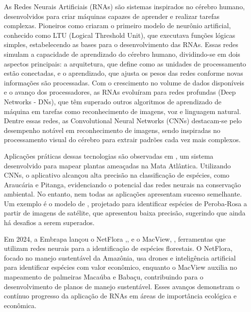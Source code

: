 As Redes Neurais Artificiais (RNAs) são sistemas inspirados no cérebro humano, desenvolvidos para criar máquinas capazes de aprender e realizar tarefas complexas. Pioneiros como \textcite{mcculloch1943logical} criaram o primeiro modelo de neurônio artificial, conhecido como LTU (Logical Threshold Unit), que executava funções lógicas simples, estabelecendo as bases para o desenvolvimento das RNAs. Essas redes simulam a capacidade de aprendizado do cérebro humano, dividindo-se em dois aspectos principais: a arquitetura, que define como as unidades de processamento estão conectadas, e o aprendizado, que ajusta os pesos das redes conforme novas informações são processadas.
Com o crescimento no volume de dados disponíveis e o avanço dos processadores, as RNAs evoluíram para redes profundas (Deep Networks - DNs), que têm superado outros algoritmos de aprendizado de máquina em tarefas como reconhecimento de imagens, voz e linguagem natural. Dentre essas redes, as Convolutional Neural Networks (CNNs) destacam-se pelo desempenho notável em reconhecimento de imagens, sendo inspiradas no processamento visual do cérebro para extrair padrões cada vez mais complexos.

Aplicações práticas dessas tecnologias são observadas em \textcite{de2020plantai}, um sistema desenvolvido para mapear plantas ameaçadas na Mata Atlântica. Utilizando CNNs, o aplicativo alcançou alta precisão na classificação de espécies, como Araucária e Pitanga, evidenciando o potencial das redes neurais na conservação ambiental. No entanto, nem todas as aplicações apresentam sucesso semelhante. Um exemplo é o modelo de \textcite{carneiro2023uso} , projetado para identificar espécies de Peroba-Rosa a partir de imagens de satélite, que apresentou baixa precisão, sugerindo que ainda há desafios a serem superados.

Em 2024, a Embrapa lançou o NetFlora ,\textcite{netflora}, e o MacView, \textcite{embrapa_agroenergia}, ferramentas que utilizam redes neurais para a identificação de espécies florestais. O NetFlora, focado no manejo sustentável da Amazônia, usa drones e inteligência artificial para identificar espécies com valor econômico, enquanto o MacView auxilia no mapeamento de palmeiras Macaúba e Babaçu, contribuindo para o desenvolvimento de planos de manejo sustentável. Esses avanços demonstram o contínuo progresso da aplicação de RNAs em áreas de importância ecológica e econômica.